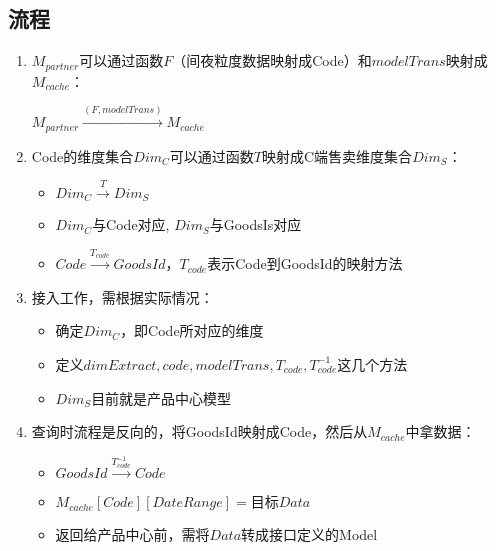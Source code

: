 \documentclass[a4paper]{article}
\begin{document}
\subsection{ 流程 }
\begin{enumerate}
\item $M_{partner}$可以通过函数$F$（间夜粒度数据映射成Code）和$modelTrans$映射成$M_{cache}$：
\begin{center}
    $M_{partner}\stackrel{(F,modelTrans)}{\longrightarrow} M_{cache}$
\end{center}
\item Code的维度集合$Dim_C$可以通过函数$T$映射成C端售卖维度集合$Dim_S$：
\begin{itemize}
\item $Dim_C  \stackrel{T}{\longrightarrow} Dim_S$
\item $Dim_C $与Code对应, $Dim_S$与GoodsIs对应
\item $Code  \stackrel{T_{code}}{\longrightarrow} GoodsId$，$T_{code}$表示Code到GoodsId的映射方法
\end{itemize}
\item 接入工作，需根据实际情况：
\begin{itemize}
\item 确定$Dim_C$，即Code所对应的维度
\item 定义$dimExtract, code, modelTrans, T_{code}, T_{code}^{-1}$这几个方法
\item $Dim_S$目前就是产品中心模型
\end{itemize}
\item 查询时流程是反向的，将GoodsId映射成Code，然后从$M_{cache}$中拿数据：
\begin{itemize}
\item $GoodsId  \stackrel{T_{code}^{-1}}{\longrightarrow} Code$
\item $M_{cache}[Code][DateRange] = 目标Data$
\item 返回给产品中心前，需将$Data$转成接口定义的Model
\end{itemize}
\end{enumerate}
\end{document}
